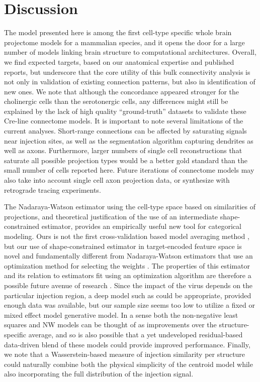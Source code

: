 \section{Discussion}

The model presented here is among the first cell-type specific whole brain projectome models for a mammalian species, and it opens the door for a large number of models linking brain structure to computational architectures. 
Overall, we find expected targets, based on our anatomical expertise and published reports, but underscore that the core utility of this bulk connectivity analysis is not only in validation of existing connection patterns, but also in identification of new ones.
We note that although the concordance appeared stronger for the cholinergic cells than the serotonergic cells, any differences might still be explained by the lack of high quality “ground-truth” datasets to validate these Cre-line connectome models.
It is important to note several limitations of the current analyses.
Short-range connections can be affected by saturating signals near injection sites, as well as the segmentation algorithm capturing dendrites as well as axons.
Furthermore, larger numbers of single cell reconstructions that saturate all possible projection types would be a better gold standard than the small number of cells reported here.
Future iterations of connectome models may also take into account single cell axon projection data, or synthesize with retrograde tracing experiments.


The Nadaraya-Watson estimator using the cell-type space based on similarities of projections, and theoretical justification of the use of an intermediate shape-constrained estimator, provides an empirically useful new tool for categorical modeling.
Ours is not the first cross-validation based model averaging method \citet{Gao2016-qe}, but our use of shape-constrained estimator in target-encoded feature space is novel and fundamentally different from Nadaraya-Watson estimators that use an optimization method for selecting the weights \citep{Saul2003-th}.
The properties of this estimator and its relation to estimators fit using an optimization algorithm are therefore a possible future avenue of research \citep{Groeneboom2018-ow, Salha_undated-ev}.
Since the impact of the virus depends on the particular injection region, a deep model such as \citet{Lotfollahi2019-tr} could be appropriate, provided enough data was available, but our sample size seems too low to utilize a fixed or mixed effect model generative model.
In a sense both the non-negative least squares \citet{Oh2014-kh} and NW models can be thought of as improvements over the structure-specific average, and so is also possible that a yet undeveloped residual-based data-driven blend of these models could provide improved performance.
Finally, we note that a Wasserstein-based measure of injection similarity per structure could naturally combine both the physical simplicity of the centroid model while also incorporating the full distribution of the injection signal.

